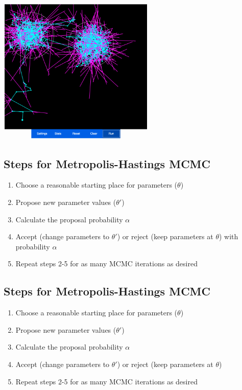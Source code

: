 \documentclass[
  letterpaper,
  DIV=11,
  numbers=noendperiod]{scrartcl}
\providecommand{\tightlist}{%
  \setlength{\itemsep}{0pt}\setlength{\parskip}{0pt}}\usepackage{longtable,booktabs,array}
\begin{document}
\framebreak

\begin{center}
  \includegraphics[height=7cm]{../graphics/mcmc-demo5.png}
\end{center}

\hypertarget{steps-for-metropolis-hastings-mcmc}{%
\subsection{Steps for Metropolis-Hastings
MCMC}\label{steps-for-metropolis-hastings-mcmc}}

\large

\begin{enumerate}
\def\labelenumi{\arabic{enumi}.}
\tightlist
\item
  Choose a reasonable starting place for parameters (\(\theta\))
\item
  Propose new parameter values (\(\theta'\))
\item
  Calculate the proposal probability \(\alpha\)
\item
  Accept (change parameters to \(\theta'\)) or reject (keep parameters
  at \(\theta\)) with probability \(\alpha\)
\item
  Repeat steps 2-5 for as many MCMC iterations as desired
\end{enumerate}

\hypertarget{steps-for-metropolis-hastings-mcmc-1}{%
\subsection{Steps for Metropolis-Hastings
MCMC}\label{steps-for-metropolis-hastings-mcmc-1}}

\large

\begin{enumerate}
\def\labelenumi{\arabic{enumi}.}
\tightlist
\item
  Choose a reasonable starting place for parameters (\(\theta\))
\item
  Propose new parameter values (\(\theta'\))
\item
  Calculate the proposal probability \(\alpha\)
\item
  Accept (change parameters to \(\theta'\)) or reject (keep parameters
  at \(\theta\))
\item
  Repeat steps 2-5 for as many MCMC iterations as desired
\end{enumerate}
\end{document}
